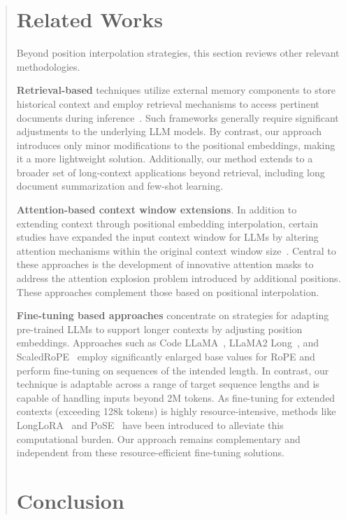 \begin{abstract}
\section{Related Works}

Beyond position interpolation strategies, this section reviews other relevant methodologies.

\textbf{Retrieval-based} techniques utilize external memory components to store historical context and employ retrieval mechanisms to access pertinent documents during inference~\cite{longllama,wang2023augmenting,borgeaud2022improving}. Such frameworks generally require significant adjustments to the underlying LLM models. By contrast, our approach introduces only minor modifications to the positional embeddings, making it a more lightweight solution. Additionally, our method extends to a broader set of long-context applications beyond retrieval, including long document summarization and few-shot learning.

\textbf{Attention-based context window extensions}. In addition to extending context through positional embedding interpolation, certain studies have expanded the input context window for LLMs by altering attention mechanisms within the original context window size~\cite{han2023lminfinite, streamingllm,parallelwindow}. Central to these approaches is the development of innovative attention masks to address the attention explosion problem introduced by additional positions. These approaches complement those based on positional interpolation.

\textbf{Fine-tuning based approaches} concentrate on strategies for adapting pre-trained LLMs to support longer contexts by adjusting position embeddings. Approaches such as Code LLaMA~\cite{codellama}, LLaMA2 Long~\cite{xiong2023effective}, and ScaledRoPE~\cite{liu2023scaling} employ significantly enlarged base values for RoPE and perform fine-tuning on sequences of the intended length. In contrast, our technique is adaptable across a range of target sequence lengths and is capable of handling inputs beyond 2M tokens. As fine-tuning for extended contexts (exceeding 128k tokens) is highly resource-intensive, methods like LongLoRA~\cite{longlora} and PoSE~\cite{zhu2023pose} have been introduced to alleviate this computational burden. Our approach remains complementary and independent from these resource-efficient fine-tuning solutions.

\section{Conclusion}


\end{abstract}
